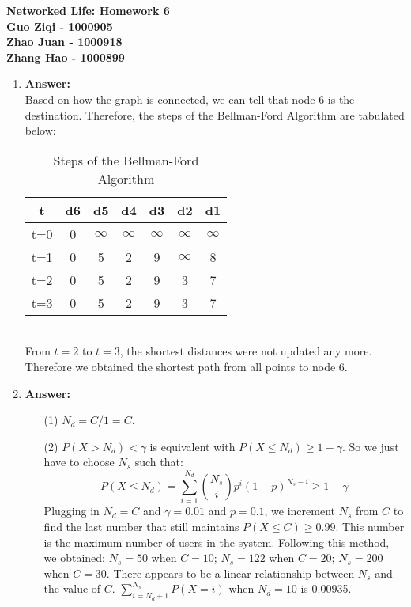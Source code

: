 \documentclass[12pt]{article}
\begin{document}
\begin{center}
\large\bf Networked Life: Homework 6
\medskip\\
Guo Ziqi - 1000905\\
Zhao Juan - 1000918\\
Zhang Hao - 1000899
\end{center}

\begin{enumerate}

\item{} \textbf{Answer:}
\medskip\\
Based on how the graph is connected, we can tell that node 6 is the destination. Therefore, the steps of the Bellman-Ford Algorithm are tabulated below:
\begin{table}[ht]

\centering
\begin{tabular}{c c c c c c c}
\hline
t & d6 & d5 & d4 & d3 & d2 & d1\\ \hline
t=0 & 0 & $\infty$ & $\infty$ & $\infty$ & $\infty$ & $\infty$ \\
t=1 & 0 & 5 & 2 & 9 & $\infty$ & 8 \\
t=2 & 0 & 5 & 2 & 9 & 3 & 7 \\
t=3 & 0 & 5 & 2 & 9 & 3 & 7 \\
\hline
\end{tabular}
\caption{Steps of the Bellman-Ford Algorithm}
\label{table: Bellman-Ford}
\end{table}\\
From $t=2$ to $t=3$, the shortest distances were not updated any more. Therefore we obtained the shortest path from all points to node 6.
\bigskip\\
\item{} \textbf{Answer:}
\begin{itemize}
\item[(1)]$N_d = C/1 = C$.
\item[(2)]$P(X>N_d)<\gamma$ is equivalent with $P(X\leq N_d)\geq1-\gamma$. So we just have to choose $N_s$ such that:
$$P(X\leq N_d)=\sum_{i=1}^{N_d}\binom{N_s}{i}p^i(1-p)^{N_s-i}\geq1-\gamma$$
Plugging in $N_d=C$ and $\gamma=0.01$ and $p=0.1$, we increment $N_s$ from $C$ to find the last number that still maintains $P(X\leq C)\geq0.99$. This number is the maximum number of users in the system. Following this method, we obtained: $N_s = 50$ when $C = 10$; $N_s = 122$ when $C = 20$; $N_s = 200$ when $C = 30$. There appears to be a linear relationship between $N_s$ and the value of $C$. $\sum_{i=N_d+1}^{N_s}P(X=i)$ when $N_d=10$ is 0.00935.

\end{itemize}
\end{enumerate}
\end{document}
